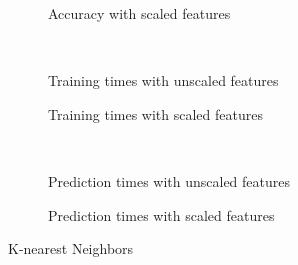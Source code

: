 \begin{figure}[!htb]
    \centering
    \begin{subfigure}[htb]{0.49\textwidth}
        \centering
        
        \label{fig:knn_accs}
    \end{subfigure}
    \begin{subfigure}[htb]{0.49\textwidth}
        \centering
        
        \caption{Accuracy with scaled features}
        \label{fig:knn_accs_scaled}
    \end{subfigure}\\
    \begin{subfigure}[htb]{0.49\textwidth}
        \centering
        
        \caption{Training times with unscaled features}
        \label{fig:knn_fit_times}
    \end{subfigure}
    \begin{subfigure}[htb]{0.49\textwidth}
        \centering
        
        \caption{Training times with scaled features}
        \label{fig:knn_fit_times_scaled}
    \end{subfigure}\\
    \begin{subfigure}[htb]{0.49\textwidth}
        \centering
        
        \caption{Prediction times with unscaled features}
        \label{fig:knn_pred_times}
    \end{subfigure}
    \begin{subfigure}[htb]{0.49\textwidth}
        \centering
        
        \caption{Prediction times with scaled features}
        \label{fig:knn_pred_times_scaled}
    \end{subfigure}
    \caption{K-nearest Neighbors}
    \label{fig:knn}
\end{figure}

